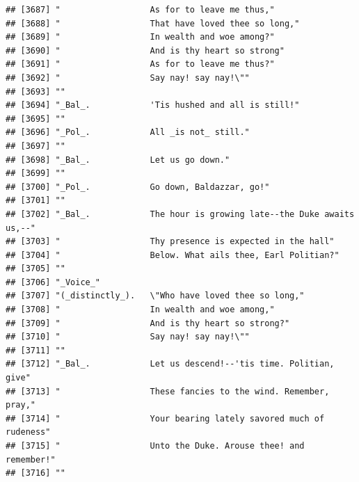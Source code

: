 \documentclass{article}\usepackage[]{graphicx}\usepackage[]{color}
\makeatletter
\newenvironment{kframe}{%
 \def\at@end@of@kframe{}%
 \ifinner\ifhmode%
  \def\at@end@of@kframe{\end{minipage}}%
  \begin{minipage}{\columnwidth}%
 \fi\fi%
 \def\FrameCommand##1{\hskip\@totalleftmargin \hskip-\fboxsep
 \colorbox{shadecolor}{##1}\hskip-\fboxsep
     \hskip-\linewidth \hskip-\@totalleftmargin \hskip\columnwidth}%
 \MakeFramed {\advance\hsize-\width
   \@totalleftmargin\z@ \linewidth\hsize
   \@setminipage}}%
 {\par\unskip\endMakeFramed%
 \at@end@of@kframe}
\newenvironment{knitrout}{}{} %
\makeatother
\begin{document}
\begin{knitrout}
\begin{kframe}
\begin{verbatim}
## [3687] "                  As for to leave me thus,"                                  
## [3688] "                  That have loved thee so long,"                             
## [3689] "                  In wealth and woe among?"                                  
## [3690] "                  And is thy heart so strong"                                
## [3691] "                  As for to leave me thus?"                                  
## [3692] "                  Say nay! say nay!\""                                       
## [3693] ""                                                                            
## [3694] "_Bal_.            'Tis hushed and all is still!"                             
## [3695] ""                                                                            
## [3696] "_Pol_.            All _is not_ still."                                       
## [3697] ""                                                                            
## [3698] "_Bal_.            Let us go down."                                           
## [3699] ""                                                                            
## [3700] "_Pol_.            Go down, Baldazzar, go!"                                   
## [3701] ""                                                                            
## [3702] "_Bal_.            The hour is growing late--the Duke awaits us,--"           
## [3703] "                  Thy presence is expected in the hall"                      
## [3704] "                  Below. What ails thee, Earl Politian?"                     
## [3705] ""                                                                            
## [3706] "_Voice_"                                                                     
## [3707] "(_distinctly_).   \"Who have loved thee so long,"                            
## [3708] "                  In wealth and woe among,"                                  
## [3709] "                  And is thy heart so strong?"                               
## [3710] "                  Say nay! say nay!\""                                       
## [3711] ""                                                                            
## [3712] "_Bal_.            Let us descend!--'tis time. Politian, give"                
## [3713] "                  These fancies to the wind. Remember, pray,"                
## [3714] "                  Your bearing lately savored much of rudeness"              
## [3715] "                  Unto the Duke. Arouse thee! and remember!"                 
## [3716] ""                                                                            

\end{verbatim}
\end{kframe}
\end{knitrout}
\end{document}
